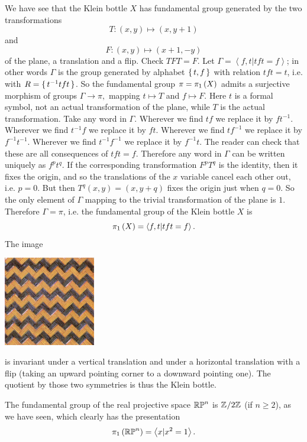 \begin{example}
We have see that the Klein bottle \(X\) has fundamental group generated by the two transformations
\[
T \colon (x,y) \mapsto (x,y+1)
\]
and
\[
F \colon (x,y) \mapsto (x+1,-y)
\]
of the plane, a translation and a flip.
Check \(TFT=F\).
Let \(\Gamma = \left<f,t|tft=f\right>\); in other words \(\Gamma\) is the group generated by alphabet \(\set{t,f}\) with relation \(tft=t\), i.e. with \(R=\set{t^{-1}tft}\).
So the fundamental group \(\pi=\pi_{1}\left(X\right)\) admits a surjective morphism of groups
\(
\Gamma \to \pi,
\)
mapping \(t \mapsto T\) and \(f \mapsto F\).
Here \(t\) is a formal symbol, not an actual transformation of the plane, while \(T\) is the actual transformation.
Take any word in \(\Gamma\).
Wherever we find \(tf\) we replace it by \(ft^{-1}\).
Wherever we find \(t^{-1}f\) we replace it by \(ft\).
Wherever we find \(tf^{-1}\) we replace it by \(f^{-1}t^{-1}\).
Wherever we find \(t^{-1}f^{-1}\) we replace it by \(f^{-1}t\).
The reader can check that these are all consequences of \(tft=f\).
Therefore any word in \(\Gamma\) can be written uniquely as \(f^p t^q\).
If the corresponding transformation \(F^p T^q\) is the identity, then it fixes the origin, and so the translations of the \(x\) variable cancel each other out, i.e. \(p=0\).
But then \(T^q(x,y)=(x,y+q)\) fixes the origin just when \(q=0\).
So the only element of \(\Gamma\) mapping to the trivial transformation of the plane is \(1\).
Therefore \(\Gamma=\pi\), i.e. the fundamental group of the Klein bottle \(X\) is
\[
\pi_{1}\left(X\right)=\left<f,t|tft=f\right>.
\]
The image
\begin{center}
\includegraphics[width=4cm]{Wallpaper_group-pg-1.jpg}
\end{center}
is invariant under a vertical translation and under a horizontal translation with a flip (taking an upward pointing corner to a downward pointing one).
The quotient by those two symmetries is thus the Klein bottle.
\end{example}
\begin{example}
The fundamental group of the real projective space \(\mathbb{RP}^{n}\) is \(\mathbb{Z}^{}/2\mathbb{Z}^{}\) (if \(n\ge 2\)), as we have seen, which clearly has the presentation
\[
\pi_{1}\left(\mathbb{RP}^{n}\right) = \left<x|x^2=1\right>.
\]
\end{example}

